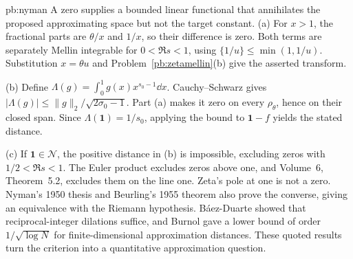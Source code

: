 \begin{solution}{pb:nyman}
\idea A zero supplies a bounded linear functional that annihilates the proposed approximating space but not the target constant.
\writeup (a) For $x>1$, the fractional parts are $\theta/x$ and $1/x$, so their difference is zero. Both terms are separately Mellin integrable for $0<\Re s<1$, using $\{1/u\}\le\min(1,1/u)$. Substitution $x=\theta u$ and Problem~\ref{pb:zetamellin}(b) give the asserted transform.

(b) Define $\Lambda(g)=\int_0^1g(x)x^{s_0-1}\dd x$. Cauchy--Schwarz gives $|\Lambda(g)|\le\|g\|_2/\sqrt{2\sigma_0-1}$. Part (a) makes it zero on every $\rho_\theta$, hence on their closed span. Since $\Lambda(\mathbf1)=1/s_0$, applying the bound to $\mathbf1-f$ yields the stated distance.

(c) If $\mathbf1\in\mathcal N$, the positive distance in (b) is impossible, excluding zeros with $1/2<\Re s<1$. The Euler product excludes zeros above one, and Volume~6, Theorem~5.2, excludes them on the line one. Zeta's pole at one is not a zero.
\leads Nyman's 1950 thesis and Beurling's 1955 theorem also prove the converse, giving an equivalence with the Riemann hypothesis. Báez-Duarte showed that reciprocal-integer dilations suffice, and Burnol gave a lower bound of order $1/\sqrt{\log N}$ for finite-dimensional approximation distances. These quoted results turn the criterion into a quantitative approximation question.
\end{solution}
